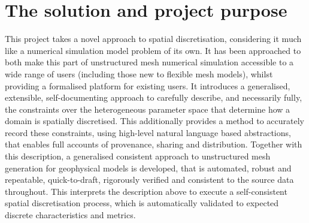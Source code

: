 \documentclass[a4paper, 10pt]{book}
\begin{document}
\section{The solution and project purpose}
%
This project
takes a novel approach to spatial discretisation, considering it much like a numerical simulation model problem of its own.
%
It has been approached to both make this part of unstructured mesh numerical simulation
accessible to a wide range of users (including those new to flexible mesh models), whilst
providing a formalised platform for existing users.
%
It introduces a generalised, extensible, self-documenting approach to carefully
describe, and necessarily fully, the constraints over the
heterogeneous parameter space that determine how a domain is spatially discretised.
%
This additionally provides a method to accurately record these constraints,
using high-level natural language based abstractions,
that enables full accounts of provenance, sharing and distribution.
%
Together with this description, a generalised consistent approach to unstructured mesh generation for geophysical models is developed,
that is automated, robust and repeatable, quick-to-draft, rigorously verified and consistent to the source data throughout.
%
This interprets the description above to execute a self-consistent spatial discretisation process,
which is automatically validated to expected discrete characteristics and metrics.

\vspace{2cm}
\end{document}
